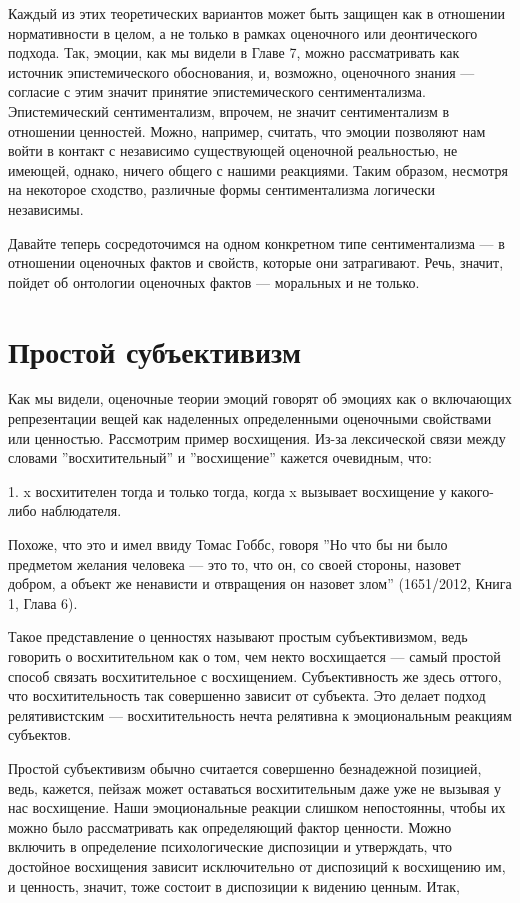 \documentclass[11pt]{book}
\begin{document}
Каждый из этих теоретических вариантов может быть защищен как в отношении нормативности в целом, а не только в рамках оценочного или деонтического подхода. Так, эмоции, как мы видели в Главе 7, можно рассматривать как источник эпистемического обоснования, и, возможно, оценочного знания --- согласие с этим значит принятие эпистемического сентиментализма. Эпистемический сентиментализм, впрочем, не значит сентиментализм в отношении ценностей. Можно, например, считать, что эмоции позволяют нам войти в контакт с независимо существующей оценочной реальностью, не имеющей, однако, ничего общего с нашими реакциями. Таким образом, несмотря на некоторое сходство, различные формы сентиментализма логически независимы.

Давайте теперь сосредоточимся на одном конкретном типе сентиментализма --- в отношении оценочных фактов и свойств, которые они затрагивают. Речь, значит, пойдет об онтологии оценочных фактов --- моральных и не только.

\section{Простой субъективизм}

Как мы видели, оценочные теории эмоций говорят об эмоциях как о включающих репрезентации вещей как наделенных определенными оценочными свойствами или ценностью. Рассмотрим пример восхищения. Из-за лексической связи между словами ''восхитительный'' и ''восхищение'' кажется очевидным, что:

\smallskip

1. x восхитителен тогда и только тогда, когда x вызывает восхищение у какого-либо наблюдателя.

\smallskip

Похоже, что это и имел ввиду Томас Гоббс, говоря ''Но что бы ни было предметом желания человека --- это то, что он, со своей стороны, назовет добром, а объект же ненависти и отвращения он назовет злом'' (1651/2012, Книга 1, Глава 6).

Такое представление о ценностях называют простым субъективизмом, ведь говорить о восхитительном как о том, чем некто восхищается --- самый простой способ связать восхитительное с восхищением. Субъективность же здесь оттого, что восхитительность так совершенно зависит от субъекта. Это делает подход релятивистским --- восхитительность нечта релятивна к эмоциональным реакциям субъектов.

Простой субъективизм обычно считается совершенно безнадежной позицией, ведь, кажется, пейзаж может оставаться восхитительным даже уже не вызывая у нас восхищение. Наши эмоциональные реакции слишком непостоянны, чтобы их можно было рассматривать как определяющий фактор ценности. Можно включить в определение психологические диспозиции и утверждать, что достойное восхищения зависит исключительно от диспозиций к восхищению им, и ценность, значит, тоже состоит в диспозиции к видению ценным. Итак,
\end{document}
